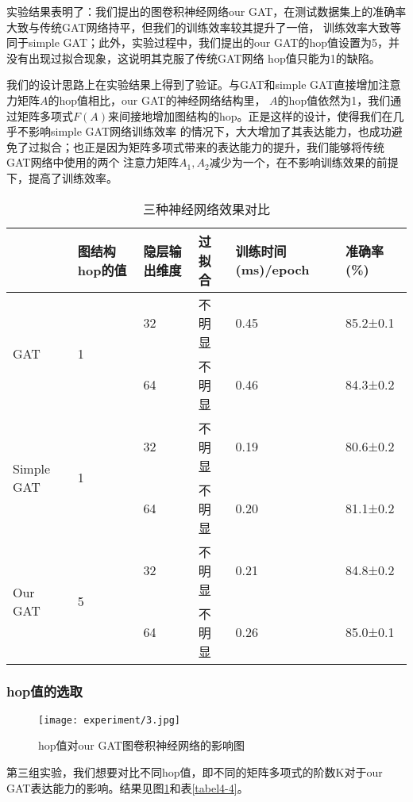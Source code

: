 实验结果表明了：我们提出的图卷积神经网络our GAT，在测试数据集上的准确率大致与传统GAT网络持平，但我们的训练效率较其提升了一倍，
训练效率大致等同于simple GAT；此外，实验过程中，我们提出的our GAT的hop值设置为5，并没有出现过拟合现象，这说明其克服了传统GAT网络
hop值只能为1的缺陷。

我们的设计思路上在实验结果上得到了验证。与GAT和simple GAT直接增加注意力矩阵$A$的hop值相比，our GAT的神经网络结构里，
$A$的hop值依然为1，我们通过矩阵多项式$ F(A) $来间接地增加图结构的hop。正是这样的设计，使得我们在几乎不影响simple GAT网络训练效率
的情况下，大大增加了其表达能力，也成功避免了过拟合；也正是因为矩阵多项式带来的表达能力的提升，我们能够将传统GAT网络中使用的两个
注意力矩阵$ A_1,A_2 $减少为一个，在不影响训练效果的前提下，提高了训练效率。

\begin{table}[]
    \centering
    \caption{三种神经网络效果对比}
    \label{tabel4-3}
    \begin{tabular}{|l|l|l|l|l|l|}
    \hline
                                & 图结构hop的值           & 隐层输出维度 & 过拟合 & 训练时间(ms)/epoch & 准确率(\%)       \\ \hline
    \multirow{2}{*}{GAT}        & \multirow{2}{*}{1} & 32     & 不明显 & 0.45           & 85.2±0.1 \\ \cline{3-6} 
                                &                    & 64     & 不明显 & 0.46           & 84.3±0.2 \\ \hline
    \multirow{2}{*}{Simple GAT} & \multirow{2}{*}{1} & 32     & 不明显 & 0.19           & 80.6±0.2 \\ \cline{3-6} 
                                &                    & 64     & 不明显 & 0.20           & 81.1±0.2 \\ \hline
    \multirow{2}{*}{Our GAT}    & \multirow{2}{*}{5} & 32     & 不明显 & 0.21           & 84.8±0.2 \\ \cline{3-6} 
                                &                    & 64     & 不明显 & 0.26           & 85.0±0.1 \\ \hline
    \end{tabular}
\end{table}

\subsubsection{hop值的选取}
\begin{figure}[ht]
    \centering
    \texttt{[image: experiment/3.jpg]}
    \caption{\label{4-3}hop值对our GAT图卷积神经网络的影响图}
\end{figure}
第三组实验，我们想要对比不同hop值，即不同的矩阵多项式的阶数K对于our GAT表达能力的影响。结果见图\ref{4-3}和表\ref{tabel4-4}。

